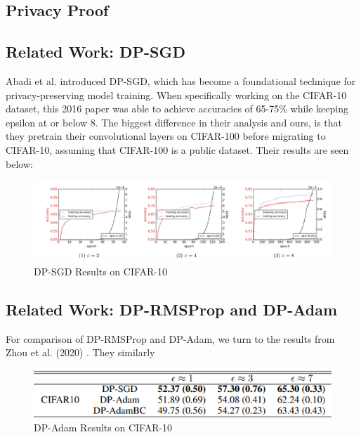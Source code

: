 \subsection{Privacy Proof}\label{subsec:privacy-proof}

\subsection{Related Work: DP-SGD}\label{subsec:related-work}
Abadi et al. \cite{Abadi_2016_DeepLearningDifferentialPrivacy} introduced DP-SGD, which has become a foundational technique for
privacy-preserving model training. When specifically working on the CIFAR-10 dataset, this 2016 paper was able to achieve accuracies
of 65-75\% while keeping epsilon at or below 8. The biggest difference in their analysis and ours, is that they pretrain their convolutional
layers on CIFAR-100 before migrating to CIFAR-10, assuming that CIFAR-100 is a public dataset. Their results are seen below:
\begin{figure}[ht]
    \centering
    \includegraphics[width=\textwidth]{dp-sgd_results.PNG}
    \caption{DP-SGD Results on CIFAR-10 \cite{Abadi_2016_DeepLearningDifferentialPrivacy}}
    \label{fig:image_label}
\end{figure}

\subsection{Related Work: DP-RMSProp and DP-Adam}\label{subsec:related-work-RMSProp}
For comparison of DP-RMSProp and DP-Adam, we turn to the results from Zhou et al. (2020) \cite{zhou_2020_private_adaptive_algorithms}. They 
similarly 

\begin{figure}[ht]
    \centering
    \includegraphics[width=\textwidth]{dp-adam-rms-results.PNG}
    \caption{DP-Adam Results on CIFAR-10 \cite{tang2023dpadambcdpadamactuallydpsgd}}
    \label{fig:image_label}
\end{figure}